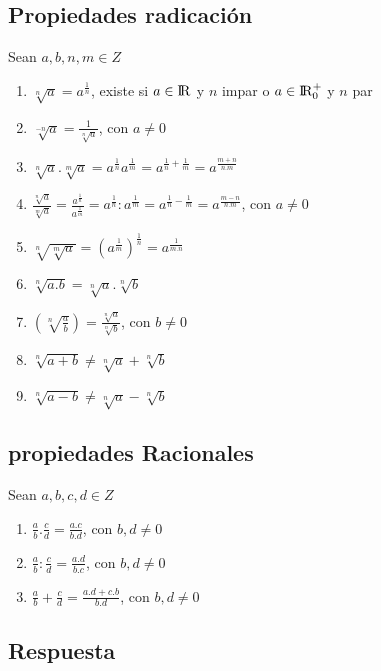     \subsection{Propiedades radicación}
    Sean $a,b,n,m \in Z$
    \begin{enumerate}
        \item $\sqrt[n]{a} = a^{\frac{1}{n}}$, existe si $a \in \rm I\!R$ y $n$ impar o $a \in \rm I\!R_{0}^{+} $ y $n$ par
        \item $ \sqrt[-n]{a}=\frac{1}{\sqrt[n]{a}} $, con $a \ne 0$ 
        \item $\sqrt[n]{a}.\sqrt[m]{a} = a^{\frac{1}{n}} a^{\frac{1}{m}} = a^{\frac{1}{n}+\frac{1}{m}} = a^{\frac{m+n}{n.m}} $
        \item $ \frac{\sqrt[n]{a}}{\sqrt[m]{a}} = \frac{a^{\frac{1}{n}}}{a^{\frac{1}{m}}} = a^{\frac{1}{n}}: a^{\frac{1}{m}} = a^{\frac{1}{n}-\frac{1}{m}} = a^{\frac{m-n}{n.m}} $, con $a \neq 0 $
        \item $ \sqrt[n]{\sqrt[m]{a}} = (a^{\frac{1}{m}})^{\frac{1}{n}} = a^{\frac{1}{m.n}} $
        \item $ \sqrt[n]{a.b} = \sqrt[n]{a}.\sqrt[n]{b} $
        \item $ (\sqrt[n]{\frac{a}{b}}) = \frac{\sqrt[n]{a}}{\sqrt[n]{b}} $, con $b \ne 0$ 
        \item $ \sqrt[n]{a+b} \ne \sqrt[n]{a} + \sqrt[n]{b} $
        \item $ \sqrt[n]{a-b} \ne \sqrt[n]{a} - \sqrt[n]{b} $
    \end{enumerate}
    
    \subsection{propiedades Racionales}
    Sean $a,b,c,d \in Z$
    \begin{enumerate}
        \item $\frac{a}{b}. \frac{c}{d} = \frac{a.c}{b.d}$, con $b, d \neq 0$
        \item $\frac{a}{b}:\frac{c}{d} = \frac{a.d}{b.c}$, con $b, d \neq 0$
        \item $\frac{a}{b} + \frac{c}{d} = \frac{a.d+c.b}{b.d}$, con $b, d \neq 0$
    \end{enumerate}
    
    \subsection{Respuesta}
    
